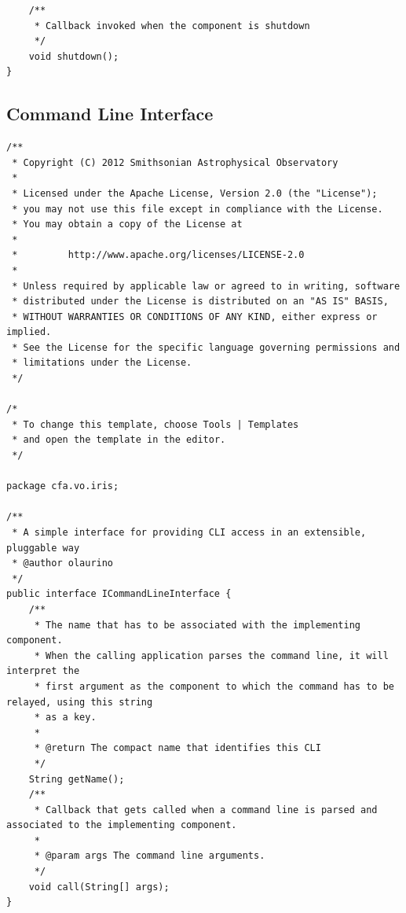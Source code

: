 \documentclass[preprint,12pt,3p]{elsarticle}
\begin{document}
\begin{verbatim}
    /**
     * Callback invoked when the component is shutdown
     */
    void shutdown();
}
\end{verbatim}

\subsection{Command Line Interface} \label{lst:cli}
\begin{verbatim}
/**
 * Copyright (C) 2012 Smithsonian Astrophysical Observatory
 *
 * Licensed under the Apache License, Version 2.0 (the "License");
 * you may not use this file except in compliance with the License.
 * You may obtain a copy of the License at
 *
 *         http://www.apache.org/licenses/LICENSE-2.0
 *
 * Unless required by applicable law or agreed to in writing, software
 * distributed under the License is distributed on an "AS IS" BASIS,
 * WITHOUT WARRANTIES OR CONDITIONS OF ANY KIND, either express or implied.
 * See the License for the specific language governing permissions and
 * limitations under the License.
 */

/*
 * To change this template, choose Tools | Templates
 * and open the template in the editor.
 */

package cfa.vo.iris;

/**
 * A simple interface for providing CLI access in an extensible, pluggable way
 * @author olaurino
 */
public interface ICommandLineInterface {
    /**
     * The name that has to be associated with the implementing component.
     * When the calling application parses the command line, it will interpret the
     * first argument as the component to which the command has to be relayed, using this string
     * as a key.
     *
     * @return The compact name that identifies this CLI
     */
    String getName();
    /**
     * Callback that gets called when a command line is parsed and associated to the implementing component.
     *
     * @param args The command line arguments.
     */
    void call(String[] args);
}
\end{verbatim}
\end{document}
